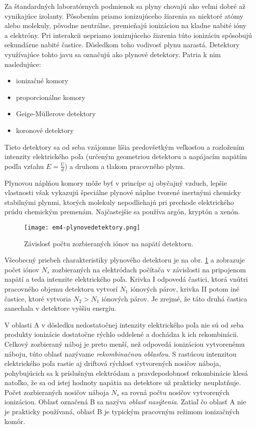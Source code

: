 \documentclass[../../main.tex]{subfiles}
\begin{document}
Za štandardných laboratórnych podmienok sa plyny chovajú ako veľmi dobré až vynikajúce izolanty. Pôsobením priamo ionizujúceho žiarenia sa niektoré atómy alebo molekuly, pôvodne neutrálne, premieňajú ionizáciou na kladne nabité ióny a elektróny. Pri interakcii nepriamo ionizujúceho žiarenia túto ionizáciu spôsobujú sekundárne nabité častice. Dôsledkom toho vodivosť plynu narastá. Detektory využívajúce tohto javu sa označujú ako plynové detektory. Patria k nim nasledujúce:
\begin{itemize}
\item ionizačné komory
\item proporcionálne komory
\item Geige-M\"{u}llerove detektory
\item koronové detektory
\end{itemize}
Tieto detektory sa od seba vzájomne líšia predovšetkým veľkosťou a rozložením intenzity elektrického poľa (určeným geometriou detektoru a napájacím napätím podľa vzťahu $E=\frac{U}{d}$) a druhom a tlakom pracovného plynu.

Plynovou náplňou komory môže byť v princípe aj obyčajný vzduch, lepšie vlastnosti však vykazujú špeciálne plynové náplne tvorené inertnými chemicky stabilnými plynmi, ktorých molekuly nepodliehajú pri prechode elektrického prúdu chemickým premenám. Najčastejšie sa používa argón, kryptón a xenón.

\begin{figure}[h]
\centering
\texttt{[image: em4-plynovedetektory.png]}
\caption{Závislosť počtu zozbieraných iónov na napätí detektoru.}
\label{em4:img:plynovedetektory}
\end{figure}

Všeobecný priebeh charakteristiky plynového detektoru je na obr. \ref{em4:img:plynovedetektory} a zobrazuje počet iónov $N_s$ zozbieraných na elektródach počítača v závislosti na pripojenom napätí a teda intenzite elektrického poľa. Krivka I odpovedá častici, ktorá vnútri pracovného objemu detektoru vytvorí $N_1$ iónových párov, krivka II potom iné častice, ktoré vytvoria $N_2>N_1$ iónových párov. Je zrejmé, že táto druhá častica zanechala v detektore vyššiu energiu.

V oblasti A v dôsledku nedostatočnej intenzity elektrického poľa nie sú od seba produkty ionizácie dostatočne rýchlo oddelené a dochádza k ich rekombinácii. Celkový zozbieraný náboj je preto menší, než odpovedá ionizáciou vytvorenému náboju, túto oblasť nazývame \textit{rekombinačnou oblasťou}. S rastúcou intenzitou elektrického poľa rastie aj driftová rýchlosť vytvorených nosičov náboja, pohybujúcich sa k príslušným elektródam a pravdepodobnosť rekombinácie klesá natoľko, že sa od istej hodnoty napätia na detektore už prakticky neuplatňuje. Počet zozbieraných nosičov náboja $N_s$ sa rovná počtu nosičov vytvorených ionizáciou. Oblasť označená B sa nazýva \textit{oblasť nasýtenia}. Zatiaľ čo oblasť A nie je prakticky používaná, oblasť B je typickým pracovným režimom ionizačných komôr.
\end{document}
